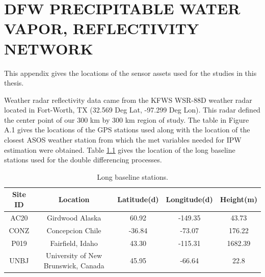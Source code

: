 \documentclass[proposal]{umassthesis}
\begin{document}
\appendix
\chapter{DFW PRECIPITABLE WATER VAPOR, REFLECTIVITY NETWORK}
This appendix gives the locations of the sensor assets used for the studies in this thesis.

Weather radar reflectivity data came from the KFWS WSR-88D weather radar located in Fort-Worth, TX (32.569 Deg Lat, -97.299 Deg Lon). This radar defined the center point of our 300 km by 300 km region of study. The table in Figure A.1 gives the locations of the GPS stations used along with the location of the closest ASOS weather station from which the met variables needed for IPW estimation were obtained. Table \ref{table:Long_Baseline} gives the location of the long baseline stations used for the double differencing processes. 
\begin{table}[!h]
\begin{center}
\caption{Long baseline stations.}
\begin{tabular}{ |c|c|c|c|c| } 
 \hline
 Site ID & Location & Latitude(d) & Longitude(d) & Height(m)  \\ 
 \hline
AC20 & Girdwood Alaska & 60.92 & -149.35 & 43.73 \\
CONZ & Concepcion Chile & -36.84 & -73.07 & 176.22 \\
P019 & Fairfield, Idaho & 43.30 & -115.31 & 1682.39 \\
UNBJ & University of New Brunswick, Canada & 45.95 & -66.64 & 22.8 \\
\hline
\end{tabular}
\label{table:Long_Baseline}
\end{center}
\end{table}
\end{document}
